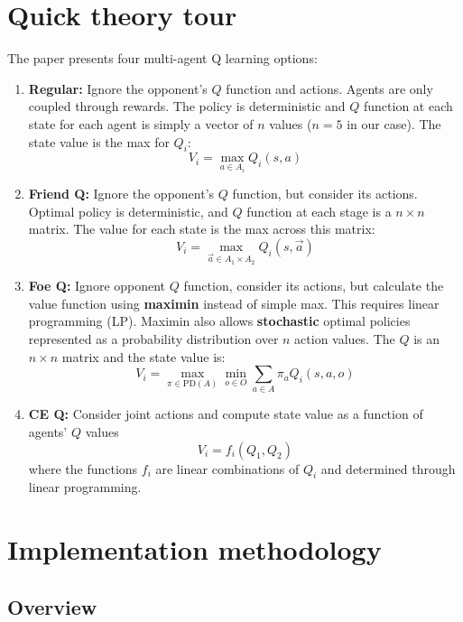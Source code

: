\documentclass[conference]{IEEEtran}
\begin{document}
\section{Quick theory tour}
The paper presents four multi-agent Q learning options:
\begin{enumerate}
\item {\bf Regular:} Ignore the opponent's $Q$ function and actions. Agents are only coupled through rewards. The policy is deterministic and $Q$ function at each state for each agent is simply a vector of $n$ values ($n=5$ in our case). The state value is the max for $Q_i$: 
\begin{equation}
V_i =\max_{a\in A_i} Q_i(s,a)
\end{equation} 
%
\item {\bf Friend Q: } Ignore the opponent's $Q$ function, but consider its actions. Optimal policy is deterministic, and $Q$ function at each stage is a $n\times n$ matrix. The value for each state is the max across this matrix:
\begin{equation}
V_i = \max_{\vec{a}\in A_1\times A_2} Q_i(s, \vec{a})
\end{equation}
%
\item {\bf Foe Q: } Ignore opponent $Q$ function, consider its actions, but calculate the value function using {\bf maximin} instead of simple max. This requires linear programming (LP). Maximin also allows {\bf stochastic} optimal policies represented as a probability distribution over $n$ action values. The $Q$ is an $n\times n$ matrix and the state value is: 
%
\begin{equation}
V_i = \max_{\pi\in\text{PD}(A)}\min_{o\in O}\sum_{a\in A}\pi_a Q_i(s, a, o)
\end{equation}
%
\item {\bf CE Q: } Consider joint actions and compute state value as a function of agents' $Q$ values
%
\begin{equation}
V_i = f_i(Q_1, Q_2)
\end{equation}
where the functions $f_i$ are linear combinations of $Q_i$ and determined through linear programming. 
\end{enumerate}
\section{Implementation methodology}
\subsection{Overview}
\end{document}
